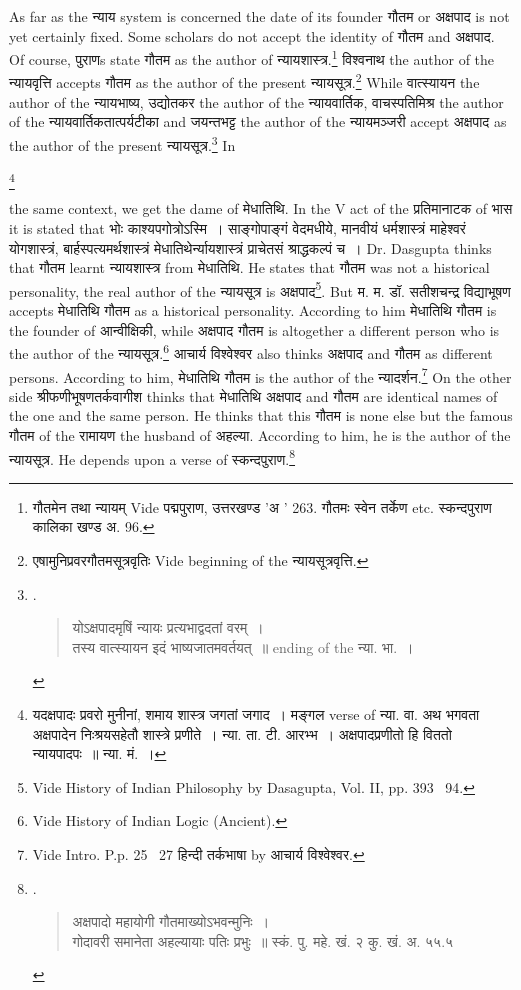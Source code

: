 \documentclass[11pt, openany]{book}
\newcommand\blfootnote[1]{%
 \begingroup
 \renewcommand\thefootnote{}\footnote{#1}%
 \addtocounter{footnote}{-1}%
 \endgroup
}
\begin{document}
As far as the न्याय system is concerned the date of its founder गौतम or अक्षपाद is not yet certainly fixed. Some scholars do not accept the identity of गौतम and अक्षपाद. Of course, पुराणs state गौतम as the author of न्यायशास्त्र.\renewcommand{\thefootnote}{4}\footnote{गौतमेन तथा न्यायम् Vide पद्मपुराण, उत्तरखण्ड 'अ ' 263. गौतमः स्वेन तर्केण etc. स्कन्दपुराण कालिका खण्ड अ. 96.} विश्वनाथ the author of the न्यायवृत्ति accepts गौतम as the author of the present न्यायसूत्र.\renewcommand{\thefootnote}{5}\footnote{एषामुनिप्रवरगौतमसूत्रवृतिः Vide beginning of the न्यायसूत्रवृत्ति.} While वात्स्यायन the author of the न्यायभाष्य, उद्योतकर the author of the न्यायवार्तिक, वाचस्पतिमिश्र the author of the न्यायवार्तिकतात्पर्यटीका and जयन्तभट्ट the author of the न्यायमञ्जरी accept अक्षपाद as the author of the present न्यायसूत्र.\renewcommand{\thefootnote}{6}\footnote{.\begin{quote}
{\qt योऽक्षपादमृषिं न्यायः प्रत्यभाद्वदतां वरम्~।\\
तस्य वात्स्यायन इदं भाष्यजातमवर्तयत्~॥} ending of the न्या. भा.~।
\end{quote}} In

\newpage
\noindent
\blfootnote{यदक्षपादः प्रवरो मुनीनां, शमाय शास्त्र जगतां जगाद~। मङ्गल verse of न्या. वा. अथ भगवता अक्षपादेन निःश्रयसहेतौ शास्त्रे प्रणीते~। न्या. ता. टी. आरभ्भ~। अक्षपादप्रणीतो हि विततो न्यायपादपः~॥ न्या. मं.~।}the same context, we get the dame of मेधातिथि. In the V act of the प्रतिमानाटक of भास it is stated that भोः काश्यपगोत्रोऽस्मि~। साङ्गोपाङ्गं वेदमधीये, मानवीयं धर्मशास्त्रं माहेश्वरं योगशास्त्रं, बार्हस्पत्यमर्थशास्त्रं मेधातिथेर्न्यायशास्त्रं प्राचेतसं श्राद्धकल्पं च~। Dr. Dasgupta thinks that गौतम learnt न्यायशास्त्र from मेधातिथि. He states that गौतम was not a historical personality, the real author of the न्यायसूत्र is अक्षपाद\renewcommand{\thefootnote}{1}\footnote{Vide History of Indian Philosophy by Dasagupta, Vol. II, pp. 393 \textendash\ 94.}. But म. म. डॉ. सतीशचन्द्र विद्याभूषण accepts मेधातिथि गौतम as a historical personality. According to him मेधातिथि गौतम is the founder of आन्वीक्षिकी, while अक्षपाद गौतम is altogether a different person who is the author of the न्यायसूत्र.\renewcommand{\thefootnote}{2}\footnote{Vide History of Indian Logic (Ancient).} आचार्य विश्वेश्वर also thinks अक्षपाद and गौतम as different persons. According to him, मेधातिथि गौतम is the author of the न्यादर्शन.\renewcommand{\thefootnote}{3}\footnote{Vide Intro. P.p. 25 \textendash\ 27 हिन्दी तर्कभाषा by आचार्य विश्वेश्वर.} On the other side श्रीफणीभूषणतर्कवागीश thinks that मेधातिथि अक्षपाद and गौतम are identical names of the one and the same person. He thinks that this गौतम is none else but the famous गौतम of the रामायण the husband of अहल्या. According to him, he is the author of the न्यायसूत्र. He depends upon a verse of स्कन्दपुराण.\renewcommand{\thefootnote}{4}\footnote{.\begin{quote}
{\qt अक्षपादो महायोगी गौतमाख्योऽभवन्मुनिः~।\\
गोदावरी समानेता अहल्यायाः पतिः प्रभुः~॥} स्कं. पु. महे. खं. २ कु. खं. अ. ५५.५
\end{quote}}
\end{document}
